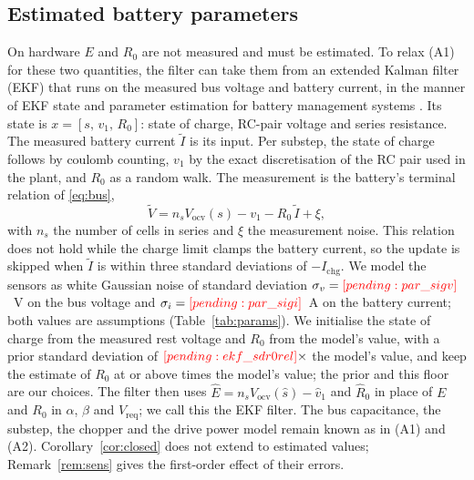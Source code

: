 \subsection{Estimated battery parameters}\label{sec:estimator}
On hardware $E$ and $R_0$ are not measured and must be estimated. To relax (A1) for these two quantities, the filter can take them from an extended Kalman filter (EKF) that runs on the measured bus voltage and battery current, in the manner of EKF state and parameter estimation for battery management systems \cite{plett2004ekf3}. Its state is $x=[s,\,v_1,\,R_0]$: state of charge, RC-pair voltage and series resistance. The measured battery current $\tilde I$ is its input. Per substep, the state of charge follows by coulomb counting, $v_1$ by the exact discretisation of the RC pair used in the plant, and $R_0$ as a random walk. The measurement is the battery's terminal relation of \eqref{eq:bus},
\begin{equation}
\tilde V = n_s V_{\mathrm{ocv}}(s) - v_1 - R_0\,\tilde I + \xi ,
\label{eq:ekfmeas}
\end{equation}
with $n_s$ the number of cells in series and $\xi$ the measurement noise. This relation does not hold while the charge limit clamps the battery current, so the update is skipped when $\tilde I$ is within three standard deviations of $-I_{\mathrm{chg}}$. We model the sensors as white Gaussian noise of standard deviation $\sigma_v=\res{par_sigv}$~V on the bus voltage and $\sigma_i=\res{par_sigi}$~A on the battery current; both values are assumptions (Table~\ref{tab:params}). We initialise the state of charge from the measured rest voltage and $R_0$ from the model's value, with a prior standard deviation of $\res{ekf_sdr0rel}\times$ the model's value, and keep the estimate of $R_0$ at or above  times the model's value; the prior and this floor are our choices. The filter then uses $\hat E = n_s V_{\mathrm{ocv}}(\hat s)-\hat v_1$ and $\hat R_0$ in place of $E$ and $R_0$ in $\alpha$, $\beta$ and $V_{\mathrm{req}}$; we call this the EKF filter. The bus capacitance, the substep, the chopper and the drive power model remain known as in (A1) and (A2). Corollary~\ref{cor:closed} does not extend to estimated values; Remark~\ref{rem:sens} gives the first-order effect of their errors.

